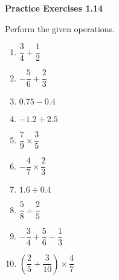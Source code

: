 \vspace{0.3ex}
\noindent\textbf{Practice Exercises 1.14}

\vspace{0.2ex}

Perform the given operations.
\begin{multicols}{2}
\begin{enumerate}
    \item \(\dfrac{3}{4} + \dfrac{1}{2}\)
    \item \( -\dfrac{5}{6} + \dfrac{2}{3}\)
    \item \(0.75 - 0.4\)
    \item \(-1.2 + 2.5\)
    \item \(\dfrac{7}{9} \times \dfrac{3}{5}\)
    \item \(-\dfrac{4}{7} \times \dfrac{2}{3}\)
    \item \(1.6 \div 0.4\)
    \item \(\dfrac{5}{8} \div \dfrac{2}{5}\)
    \item \(-\dfrac{3}{4} + \dfrac{5}{6} - \dfrac{1}{3}\)
    \item \(\left(\dfrac{2}{5} + \dfrac{3}{10} \right) \times \dfrac{4}{7}\)
\end{enumerate}
\end{multicols}
